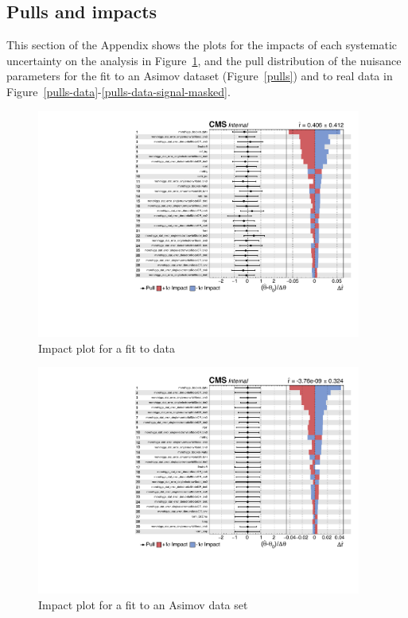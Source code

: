 \subsection{Pulls and impacts}

This section of the Appendix shows the plots for the impacts of each systematic uncertainty on the analysis in Figure~\ref{impact}, and the pull distribution of the nuisance parameters for the fit to an Asimov dataset (Figure~\ref{pulls}) and to real data in Figure~\ref{pulls-data}-\ref{pulls-data-signal-masked}. 

\begin{figure}
\centering
\includegraphics[width=0.95\textwidth]{figures/pullsImpact/impacts_data_1.pdf}
\caption{Impact plot for a fit to data}
\label{impact}
\end{figure}

\clearpage

\begin{figure}
\centering
\includegraphics[width=0.95\textwidth]{figures/pullsImpact/impacts_asimov_1.pdf}
\caption{Impact plot for a fit to an Asimov data set}
\label{impact2}
\end{figure}

